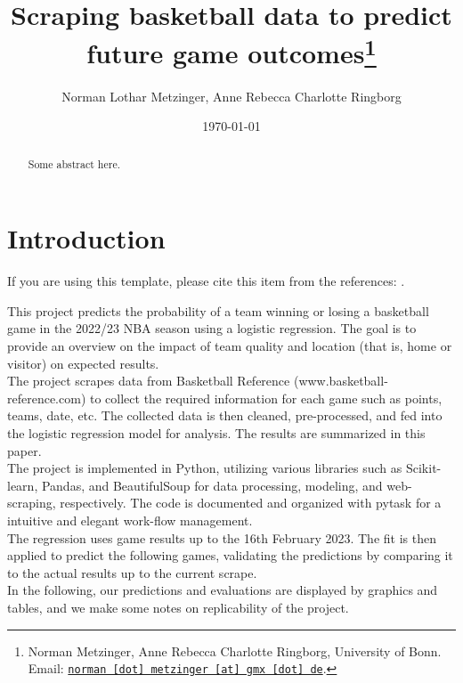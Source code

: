\documentclass[11pt, a4paper, leqno]{article}
\begin{document}
\title{Scraping basketball data to predict future game outcomes\thanks{Norman Metzinger, Anne Rebecca Charlotte Ringborg, University of Bonn. Email: \href{mailto:norman.metzinger@gmx.de}{\nolinkurl{norman [dot] metzinger [at] gmx [dot] de}}.}}

\author{Norman Lothar Metzinger, Anne Rebecca Charlotte Ringborg}

\date{
    \today
}

\maketitle


\begin{abstract}
    Some abstract here.
\end{abstract}

\clearpage


\section{Introduction} %
\label{sec:introduction}

If you are using this template, please cite this item from the references:
\citet{GaudeckerEconProjectTemplates}.

This project predicts the probability of a team winning or losing a basketball game in the 2022/23 NBA season using a logistic regression. The goal is to provide an overview on the impact of team quality and location (that is, home or visitor) on expected results.\\

The project scrapes data from Basketball Reference (www.basketball-reference.com) to collect the required information for each game such as points, teams, date, etc.
The collected data is then cleaned, pre-processed, and fed into the logistic regression model for analysis. The results are summarized in this paper.\\

The project is implemented in Python, utilizing various libraries such as Scikit-learn, Pandas, and BeautifulSoup for data processing, modeling, and web-scraping, respectively.
The code is documented and organized with pytask for a intuitive and elegant work-flow management.\\

The regression uses game results up to the 16th February 2023. The fit is then applied to predict the following games, validating the predictions by comparing it to the actual results up to the current scrape.\\
In the following, our predictions and evaluations are displayed by graphics and tables, and we make some notes on replicability of the project.
\end{document}

